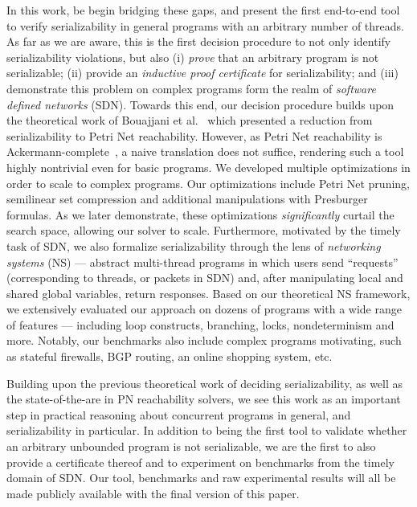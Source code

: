 In this work, be begin bridging these gaps, and present the first end-to-end tool to verify serializability in general programs with an arbitrary number of threads. 
As far as we are aware, this is the first decision procedure to not only identify serializability violations, but also (i) \textit{prove} that an arbitrary program is not serializable; (ii) provide an \textit{inductive proof certificate} for serializability; and (iii) demonstrate this problem on complex programs form the realm of \textit{software defined networks} (SDN).
%
Towards this end, our decision procedure builds upon the theoretical work of Bouajjani et al.~\cite{BoEmEnHa13} which presented a reduction from serializability to Petri Net reachability.  However, as Petri Net reachability is Ackermann-complete~\cite{CzWo22}, a naive translation does not suffice, rendering such a tool  highly nontrivial even for basic programs. We developed multiple optimizations in order to scale to complex programs. 
Our optimizations include Petri Net pruning, semilinear set compression and additional manipulations with Presburger formulas.
As we later demonstrate, these optimizations \textit{significantly} curtail the search space, allowing our solver to scale.
%
Furthermore, motivated by the timely task of SDN, 
we also formalize serializability through the lens of \textit{networking systems} (NS) --- abstract multi-thread programs in which users send ``requests'' (corresponding to threads, or packets in SDN) and, after manipulating local and shared global variables, return responses.
Based on our theoretical NS framework, we extensively evaluated our approach on dozens of programs with a wide range of features --- including loop constructs, branching, locks, nondeterminism and more. Notably, our benchmarks also include complex programs motivating, such as stateful firewalls, BGP routing, an online shopping system, etc.
  

Building upon the previous theoretical work of deciding serializability, as well as the state-of-the-are in PN reachability solvers, we see this work as an important step in practical reasoning about concurrent programs in general, and serializability in particular.
In addition to being the first tool to validate whether an arbitrary unbounded program is not serializable, we are the first to also provide a certificate thereof and to experiment on benchmarks from the timely domain of SDN.
Our tool, benchmarks and raw experimental results will all be made publicly available with the final version of this paper.

